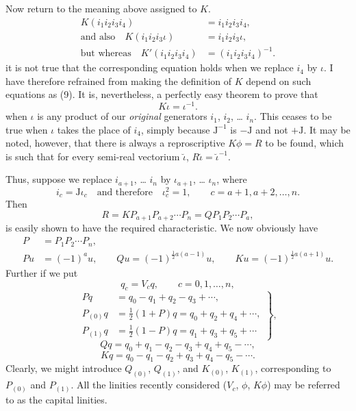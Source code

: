 \documentclass[11pt]{article}
\begin{document}
\indent Now return to the meaning above assigned to $K$.
\begin{align*}K(i_1i_2i_3i_4)&=i_1i_2i_3i_4,\\ \text{and also}\quad K(i_1i_2i_3\iota)&=i_1i_2i_3\iota,\\ \text{but whereas}\quad K'(i_1i_2i_3i_4)&=(i_1i_2i_3i_4)^{-1}.\tag{9}\end{align*}
it is not true that the corresponding equation holds when we replace $i_4$ by $\iota$. I have therefore refrained from making the definition of $K$ depend on such equations as (9). It is, nevertheless, a perfectly easy theorem to prove that
\begin{equation}K\iota=\iota^{-1}.\tag{10}\end{equation}
when $\iota$ is any product of our \emph{original} generators $i_1$, $i_2$, \ldots{} $i_n$. This ceases to be true when $\iota$ takes the place of $i_4$, simply because $\mathrm{J}^{-1}$ is $-\mathrm{J}$ and not $+\mathrm{J}$. It may be noted, however, that there is always a reproscriptive $K\phi=R$ to be found, which is such that for every semi-real vectorium $\breve{\iota}$, $R\breve{\iota}=\breve{\iota}^{-1}$.

Thus, suppose we replace $i_{a+1}$, \ldots{} $i_n$ by $\iota_{a+1}$, \ldots{} $\iota_n$, where
\begin{equation}i_c=\mathrm{J}\iota_c\quad\text{and therefore}\quad \iota_c^2=1,\qquad c=a+1,a+2,\ldots,n.\tag{11}\end{equation}
Then
\begin{equation}R=KP_{a+1}P_{a+2}\cdots P_n=QP_1P_2\cdots P_a,\tag{12}\end{equation}
is easily shown to have the required characteristic. We now obviously have
\begin{align}P&=P_1P_2\cdots P_n,\tag{13}\\ Pu&=(-1)^a u,\qquad Qu=(-1)^{\frac12a(a-1)}u,\qquad Ku=(-1)^{\frac12a(a+1)}u.\tag{14}\end{align}
Further if we put
\begin{equation}q_c=V_cq,\qquad c=0,1,\ldots,n,\tag{15}\end{equation}
\begin{equation}\left.\begin{aligned}Pq&=q_0-q_1+q_2-q_3+\cdots,\\P_{(0)}q&=\tfrac12(1+P)q=q_0+q_2+q_4+\cdots,\\P_{(1)}q&=\tfrac12(1-P)q=q_1+q_3+q_5+\cdots\end{aligned}\right\},\tag{16}\end{equation}
\begin{equation}Qq=q_0+q_1-q_2-q_3+q_4+q_5-\cdots,\tag{17}\end{equation}
\begin{equation}Kq=q_0-q_1-q_2+q_3+q_4-q_5-\cdots.\tag{18}\end{equation}
Clearly, we might introduce $Q_{(0)}$, $Q_{(1)}$, and $K_{(0)}$, $K_{(1)}$, corresponding to $P_{(0)}$ and $P_{(1)}$. All the linities recently considered ($V_c$, $\phi$, $K\phi$) may be referred to as the capital linities.
\end{document}
